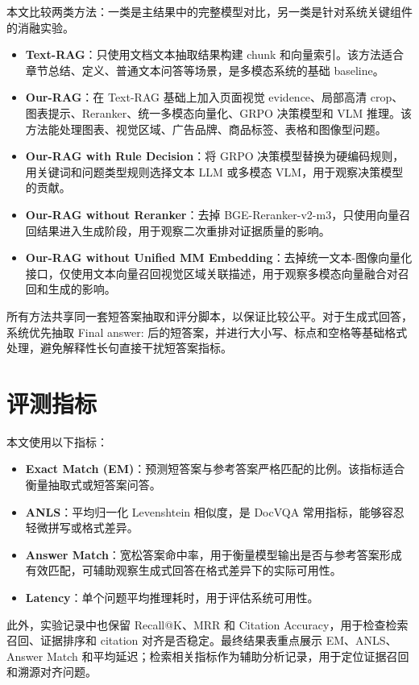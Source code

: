 本文比较两类方法：一类是主结果中的完整模型对比，另一类是针对系统关键组件的消融实验。

\begin{itemize}
  \item \textbf{Text-RAG}：只使用文档文本抽取结果构建 chunk 和向量索引。该方法适合章节总结、定义、普通文本问答等场景，是多模态系统的基础 baseline。
  \item \textbf{Our-RAG}：在 Text-RAG 基础上加入页面视觉 evidence、局部高清 crop、图表提示、Reranker、统一多模态向量化、GRPO 决策模型和 VLM 推理。该方法能处理图表、视觉区域、广告品牌、商品标签、表格和图像型问题。
  \item \textbf{Our-RAG with Rule Decision}：将 GRPO 决策模型替换为硬编码规则，用关键词和问题类型规则选择文本 LLM 或多模态 VLM，用于观察决策模型的贡献。
  \item \textbf{Our-RAG without Reranker}：去掉 BGE-Reranker-v2-m3，只使用向量召回结果进入生成阶段，用于观察二次重排对证据质量的影响。
  \item \textbf{Our-RAG without Unified MM Embedding}：去掉统一文本-图像向量化接口，仅使用文本向量召回视觉区域关联描述，用于观察多模态向量融合对召回和生成的影响。
\end{itemize}

所有方法共享同一套短答案抽取和评分脚本，以保证比较公平。对于生成式回答，系统优先抽取 Final answer: 后的短答案，并进行大小写、标点和空格等基础格式处理，避免解释性长句直接干扰短答案指标。

\section{评测指标}

本文使用以下指标：

\begin{itemize}
  \item \textbf{Exact Match (EM)}：预测短答案与参考答案严格匹配的比例。该指标适合衡量抽取式或短答案问答。
  \item \textbf{ANLS}：平均归一化 Levenshtein 相似度，是 DocVQA 常用指标，能够容忍轻微拼写或格式差异。
  \item \textbf{Answer Match}：宽松答案命中率，用于衡量模型输出是否与参考答案形成有效匹配，可辅助观察生成式回答在格式差异下的实际可用性。
  \item \textbf{Latency}：单个问题平均推理耗时，用于评估系统可用性。
\end{itemize}

此外，实验记录中也保留 Recall@K、MRR 和 Citation Accuracy，用于检查检索召回、证据排序和 citation 对齐是否稳定。最终结果表重点展示 EM、ANLS、Answer Match 和平均延迟；检索相关指标作为辅助分析记录，用于定位证据召回和溯源对齐问题。

